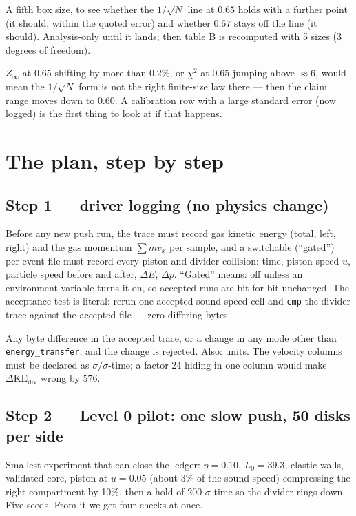 \documentclass[11pt,a4paper]{article}
\begin{document}
\begin{eli}
A fifth box size, to see whether the $1/\sqrt N$ line at $0.65$ holds with a further point (it should, within the quoted error) and whether $0.67$ stays off the line (it should). Analysis-only until it lands; then table B is recomputed with 5 sizes (3 degrees of freedom).
\end{eli}
\begin{wrong}
$Z_\infty$ at $0.65$ shifting by more than $0.2\%$, or $\chi^2$ at $0.65$ jumping above $\approx6$, would mean the $1/\sqrt N$ form is not the right finite-size law there --- then the claim range moves down to $0.60$. A calibration row with a large standard error (now logged) is the first thing to look at if that happens.
\end{wrong}

\section{The plan, step by step}

\subsection{Step 1 --- driver logging (no physics change)}
\begin{eli}
Before any new push run, the trace must record gas kinetic energy (total, left, right) and the gas momentum $\sum m v_x$ per sample, and a switchable (``gated'') per-event file must record every piston and divider collision: time, piston speed $u$, particle speed before and after, $\Delta E$, $\Delta p$. ``Gated'' means: off unless an environment variable turns it on, so accepted runs are bit-for-bit unchanged. The acceptance test is literal: rerun one accepted sound-speed cell and \texttt{cmp} the divider trace against the accepted file --- zero differing bytes.
\end{eli}
\begin{wrong}
Any byte difference in the accepted trace, or a change in any mode other than \texttt{energy\_transfer}, and the change is rejected. Also: units. The velocity columns must be declared as $\sigma/\sigma$-time; a factor 24 hiding in one column would make $\Delta\mathrm{KE}_{\mathrm{div}}$ wrong by $576$.
\end{wrong}

\subsection{Step 2 --- Level 0 pilot: one slow push, 50 disks per side}
\begin{eli}
Smallest experiment that can close the ledger: $\eta = 0.10$, $L_0 = 39.3$, elastic walls, validated core, piston at $u = 0.05$ (about 3\% of the sound speed) compressing the right compartment by 10\%, then a hold of 200 $\sigma$-time so the divider rings down. Five seeds. From it we get four checks at once.
\end{eli}
\end{document}
